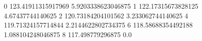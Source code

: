 0 123.41911315917969 5.9203338623046875
1 122.17315673828125 4.67437744140625
2 120.73184204101562 3.233062744140625
4 119.71324157714844 2.2144622802734375
6 118.58688354492188 1.088104248046875
8 117.498779296875 0.0
